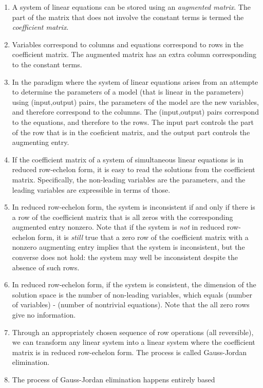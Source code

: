 \documentclass[10pt]{amsart}
\begin{document}
\begin{enumerate}
\item A system of linear equations can be stored using an {\em
  augmented matrix}. The part of the matrix that does not involve the
  constant terms is termed the {\em coefficient matrix}.
\item Variables correspond to columns and equations correspond to rows
  in the coefficient matrix. The augmented matrix has an extra column
  corresponding to the constant terms.
\item In the paradigm where the system of linear equations arises from
  an attempte to determine the parameters of a model (that is linear
  in the parameters) using (input,output) pairs, the parameters of the
  model are the new variables, and therefore correspond to the
  columns. The (input,output) pairs correspond to the equations, and
  therefore to the rows. The input part controls the part of the row
  that is in the coeficient matrix, and the output part controls the
  augmenting entry.
\item If the coefficient matrix of a system of simultaneous linear
  equations is in reduced row-echelon form, it is easy to read the
  solutions from the coefficient matrix. Specifically, the non-leading
  variables are the parameters, and the leading variables are
  expressible in terms of those.
\item In reduced row-echelon form, the system is inconsistent if and
  only if there is a row of the coefficient matrix that is all zeros
  with the corresponding augmented entry nonzero. Note that if the
  system is {\em not} in reduced row-echelon form, it is {\em still}
  true that a zero row of the coefficient matrix with a nonzero
  augmenting entry implies that the system is inconsistent, but the
  converse does not hold: the system may well be inconsistent despite
  the absence of such rows.
\item In reduced row-echelon form, if the system is consistent, the
  dimension of the solution space is the number of non-leading
  variables, which equals (number of variables) - (number of
  nontrivial equations). Note that the all zero rows give no
  information.
\item Through an appropriately chosen sequence of row operations (all
  reversible), we can transform any linear system into a linear system
  where the coefficient matrix is in reduced row-echelon form. The
  process is called Gauss-Jordan elimination.
\item The process of Gauss-Jordan elimination happens entirely based

\end{enumerate}
\end{document}
